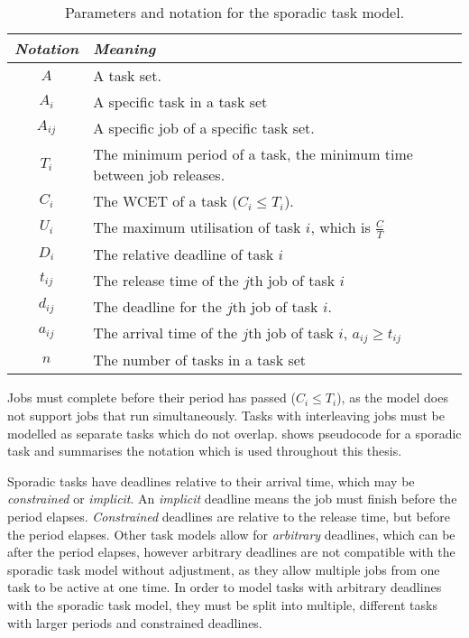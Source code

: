 \begin{table}[b]
\centering
\begin{tabularx}{\textwidth}{cX}\toprule
    \emph{Notation} & \emph{Meaning} \\\midrule
    $A$               & A task set. \\
    $A_{i}$           & A specific task in a task set \\
    $A_{ij}$          & A specific job of a specific task set. \\
    $T_{i}$           & The minimum period of a task, the minimum time between job releases. \\
        $C_{i}$       & The \gls{WCET} of a task ($C_{i} \leq T_{i}$). \\
    $U_{i}$           & The maximum utilisation of task $i$, which is $\frac{C}{T}$ \\
    $D_{i}$           & The relative deadline of task $i$ \\
    $t_{ij}$          & The release time of the $j$th job of task $i$ \\
    $d_{ij}$          & The deadline for the $j$th job of task $i$. \\
    $a_{ij}$          & The arrival time of the $j$th job of task $i$, $a_{ij} \geq t_{ij}$ \\
    $n$               & The number of tasks in a task set\\
    \bottomrule
    \end{tabularx}
    \caption{Parameters and notation for the sporadic task model.}
    \label{t:notation}
\end{table}

Jobs must complete before their period has passed ($C_{i} \leq T_{i}$), as the model does not
support jobs that run simultaneously. Tasks with interleaving jobs must be modelled as separate
tasks which do not overlap.   shows pseudocode for a sporadic task and
 summarises the notation which is used throughout this thesis.

Sporadic tasks have deadlines relative to their arrival time, which may be \emph{constrained} or
\emph{implicit}.  An \emph{implicit} deadline means the job must finish before the period elapses.
\emph{Constrained} deadlines are relative to the release time, but before the period elapses.  Other
task models allow for \emph{arbitrary} deadlines, which can be after the period elapses, however
arbitrary deadlines are not compatible with the sporadic task model without adjustment, as they allow multiple jobs from
one task to be active at one time.  In order to model tasks with arbitrary deadlines with the
sporadic task model, they must be split 
into multiple, different tasks with larger periods and
constrained deadlines.

